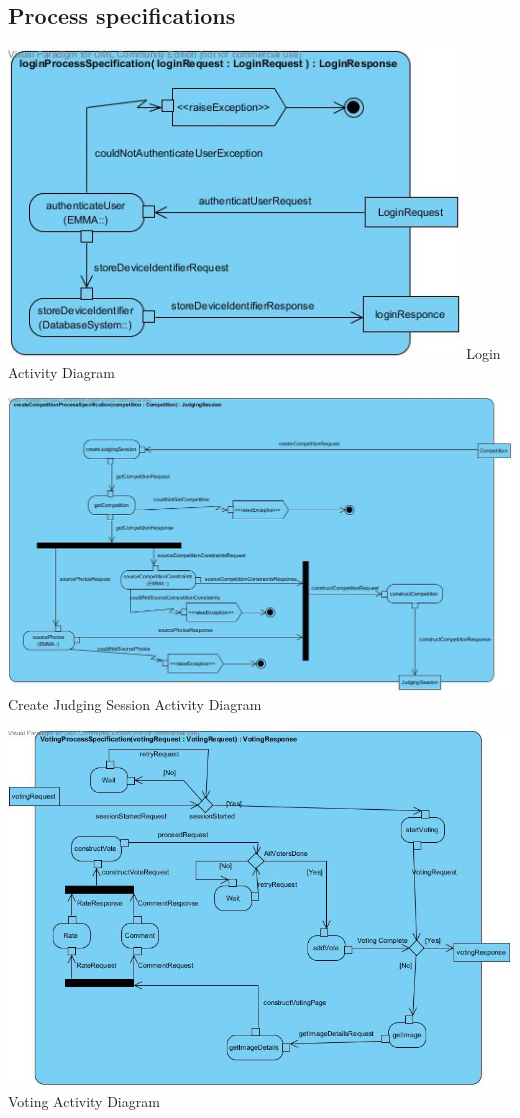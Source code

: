 \documentclass[10pt,a4paper]{article}
\begin{document}
\subsection{Process specifications}
\begin{center}
\includegraphics[width=120mm]{Pictures/LoginActivityDiagram.jpg} 
Login Activity Diagram 
\end{center}

\begin{center}
\advance\leftskip-2cm
\includegraphics[width=170mm]{Pictures/createJudgingSessionActivityDiagram.jpg} 
Create Judging Session Activity Diagram 
\end{center}

\begin{center}
\advance\leftskip-2cm
\includegraphics[width=170mm]{Pictures/VotingActivityDiagram.jpg} 
Voting Activity Diagram 
\end{center}
\end{document}
